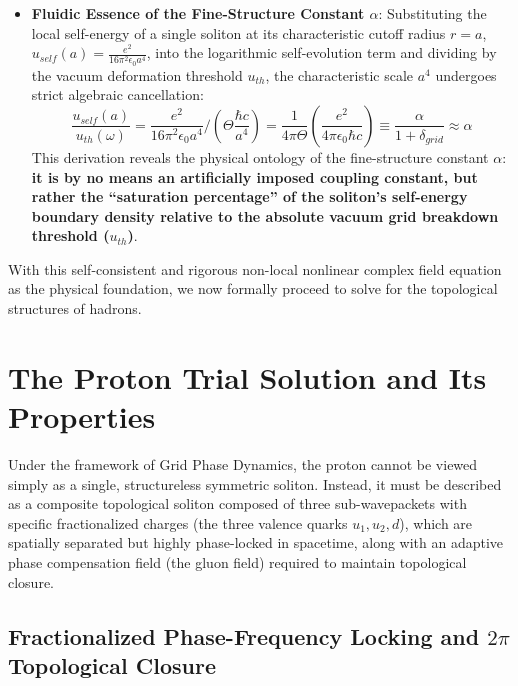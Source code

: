 \documentclass[12pt, a4paper]{article}
\begin{document}
\begin{itemize}
    \item \textbf{Fluidic Essence of the Fine-Structure Constant $\alpha$}:  
    Substituting the local self-energy of a single soliton at its characteristic cutoff radius $r=a$, $u_{self}(a) = \frac{e^2}{16\pi^2 \epsilon_0 a^4}$, into the logarithmic self-evolution term and dividing by the vacuum deformation threshold $u_{th}$, the characteristic scale $a^4$ undergoes strict algebraic cancellation:
    \begin{equation}
    \frac{u_{self}(a)}{u_{th}(\omega)} = \frac{e^2}{16\pi^2\epsilon_0 a^4} \Big/ \left( \Theta \frac{\hbar c}{a^4} \right) = \frac{1}{4\pi\Theta} \left( \frac{e^2}{4\pi\epsilon_0\hbar c} \right) \equiv \frac{\alpha}{1+\delta_{grid}} \approx \alpha \label{eq:alpha_origin}
    \end{equation}
    This derivation reveals the physical ontology of the fine-structure constant $\alpha$: \textbf{it is by no means an artificially imposed coupling constant, but rather the ``saturation percentage'' of the soliton's self-energy boundary density relative to the absolute vacuum grid breakdown threshold ($u_{th}$)}.
\end{itemize}

With this self-consistent and rigorous non-local nonlinear complex field equation as the physical foundation, we now formally proceed to solve for the topological structures of hadrons.

\section{The Proton Trial Solution and Its Properties}

Under the framework of Grid Phase Dynamics, the proton cannot be viewed simply as a single, structureless symmetric soliton. Instead, it must be described as a composite topological soliton composed of three sub-wavepackets with specific fractionalized charges (the three valence quarks $u_1, u_2, d$), which are spatially separated but highly phase-locked in spacetime, along with an adaptive phase compensation field (the gluon field) required to maintain topological closure.

\subsection{Fractionalized Phase-Frequency Locking and $2\pi$ Topological Closure}
\end{document}
